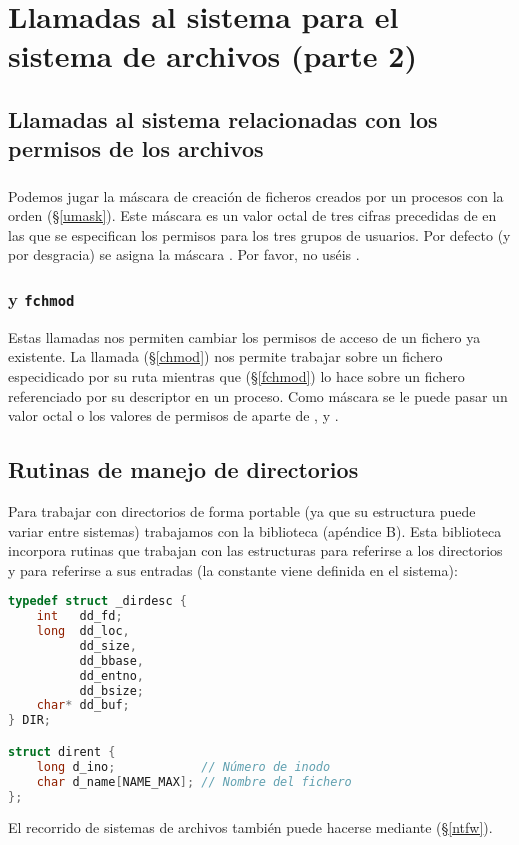 \section{Llamadas al sistema para el sistema de archivos (parte 2)}

\subsection{Llamadas al sistema relacionadas con los permisos de los archivos}

\subsubsection{}

Podemos jugar la máscara de creación de ficheros creados por un procesos con la orden  (\S\ref{umask}).
Este máscara es un valor octal de tres cifras precedidas de  en las que se especifican los permisos  para los tres grupos de usuarios.
Por defecto (y por desgracia) se asigna la máscara .
Por favor, no uséis .

\subsubsection{ y \texttt{fchmod}}

Estas llamadas nos permiten cambiar los permisos de acceso de un fichero ya existente.
La llamada  (\S\ref{chmod}) nos permite trabajar sobre un fichero especidicado por su ruta mientras que  (\S\ref{fchmod}) lo hace sobre un fichero referenciado por su descriptor en un proceso.
Como máscara se le puede pasar un valor octal o los valores de permisos de  aparte de ,  y .

\subsection{Rutinas de manejo de directorios}

Para trabajar con directorios de forma portable (ya que su estructura puede variar entre sistemas) trabajamos con la biblioteca  (apéndice B).
Esta biblioteca incorpora rutinas que trabajan con las estructuras  para referirse a los directorios y  para referirse a sus entradas (la constante  viene definida en el sistema):

\begin{lstlisting}[language=C]
typedef struct _dirdesc {
	int   dd_fd;
	long  dd_loc,
	      dd_size,
	      dd_bbase,
	      dd_entno,
	      dd_bsize;
	char* dd_buf;
} DIR;

struct dirent {
	long d_ino;            // Número de inodo
	char d_name[NAME_MAX]; // Nombre del fichero
};
\end{lstlisting}

El recorrido de sistemas de archivos también puede hacerse mediante  (\S\ref{ntfw}).

